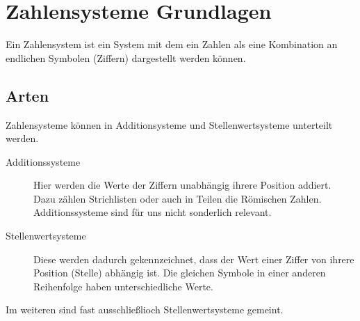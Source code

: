 \documentclass{article}
\begin{document}
\label{sec:mathe_zahlensysteme}
\section{Zahlensysteme Grundlagen} 
Ein Zahlensystem ist ein System mit dem ein Zahlen als eine Kombination an endlichen Symbolen (Ziffern) dargestellt werden können.

\subsection{Arten}
Zahlensysteme können in Additionsysteme und Stellenwertsysteme unterteilt werden.
\begin{description}
 \item[Additionssysteme] Hier werden die Werte der Ziffern unabhängig ihrere Position addiert. Dazu zählen Strichlisten oder auch in Teilen die Römischen Zahlen. Additionssysteme sind für uns nicht sonderlich relevant.
 \item[Stellenwertsysteme] Diese werden dadurch gekennzeichnet, dass der Wert einer Ziffer von ihrere Position (Stelle) abhängig ist. Die gleichen Symbole in einer anderen Reihenfolge haben unterschiedliche Werte.
\end{description}
Im weiteren sind fast ausschließlioch Stellenwertsysteme gemeint.
\end{document}
